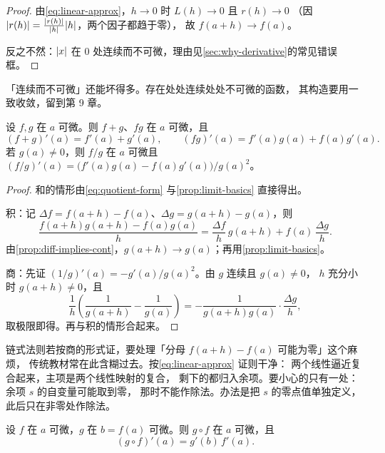 \begin{proof}
  由\cref{eq:linear-approx}，\(h \to 0\) 时 \(L(h) \to 0\) 且 \(r(h) \to 0\)
  （因 \(\lvert r(h)\rvert = \frac{\lvert r(h)\rvert}{\lvert h\rvert}\lvert h\rvert\)，两个因子都趋于零），
  故 \(f(a+h) \to f(a)\)。

  反之不然：\(\lvert x\rvert\) 在 \(0\) 处连续而不可微，理由见\cref{sec:why-derivative}的常见错误框。
\end{proof}

\begin{remark}
  「连续而不可微」还能坏得多。存在处处连续处处不可微的函数，
  其构造要用一致收敛，留到第 9 章。
\end{remark}

\begin{theorem}[四则运算]
  \label{thm:arithmetic-rules}
  设 \(f, g\) 在 \(a\) 可微。则 \(f+g\)、\(fg\) 在 \(a\) 可微，且
  \[
    (f+g)'(a) = f'(a)+g'(a), \qquad
    (fg)'(a) = f'(a)g(a) + f(a)g'(a) .
  \]
  若 \(g(a) \neq 0\)，则 \(f/g\) 在 \(a\) 可微且
  \((f/g)'(a) = \bigl(f'(a)g(a)-f(a)g'(a)\bigr)/g(a)^{2}\)。
\end{theorem}

\begin{proof}
  和的情形由\cref{eq:quotient-form} 与\cref{prop:limit-basics} 直接得出。

  积：记 \(\Delta f = f(a+h)-f(a)\)、\(\Delta g = g(a+h)-g(a)\)，则
  \[
    \frac{f(a+h)g(a+h)-f(a)g(a)}{h}
      = \frac{\Delta f}{h}\,g(a+h) + f(a)\,\frac{\Delta g}{h} .
  \]
  由\cref{prop:diff-implies-cont}，\(g(a+h) \to g(a)\)；再用\cref{prop:limit-basics}。

  商：先证 \((1/g)'(a) = -g'(a)/g(a)^{2}\)。由 \(g\) 连续且 \(g(a) \neq 0\)，
  \(h\) 充分小时 \(g(a+h) \neq 0\)，且
  \[
    \frac{1}{h}\left(\frac{1}{g(a+h)}-\frac{1}{g(a)}\right)
      = -\frac{1}{g(a+h)g(a)} \cdot \frac{\Delta g}{h} ,
  \]
  取极限即得。再与积的情形合起来。
\end{proof}

\begin{strategy}
  链式法则若按商的形式证，要处理「分母 \(f(a+h)-f(a)\) 可能为零」这个麻烦，
  传统教材常在此含糊过去。按\cref{eq:linear-approx} 证则干净：
  两个线性逼近复合起来，主项是两个线性映射的复合，
  剩下的都归入余项。要小心的只有一处：余项 \(s\) 的自变量可能取到零，
  那时不能作除法。办法是把 \(s\) 的零点值单独定义，此后只在非零处作除法。
\end{strategy}

\begin{theorem}[链式法则]
  \label{thm:chain-rule}
  设 \(f\) 在 \(a\) 可微，\(g\) 在 \(b = f(a)\) 可微。则 \(g \circ f\) 在 \(a\) 可微，且
  \[
    (g \circ f)'(a) = g'(b)\,f'(a) .
  \]
\end{theorem}

